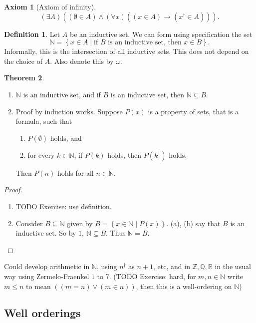 \documentclass{article}
\newcommand{\N}{\mathbb{N}}
\newcommand{\Z}{\mathbb{Z}}
\newcommand{\Q}{\mathbb{Q}}
\newcommand{\R}{\mathbb{R}}
\newcommand{\rb}[1]{\left( #1 \right)}
\newcommand{\cb}[1]{\left\{ #1 \right\}}
\newcommand{\orb}[2]{\rb{#1 \lor #2}}
\newcommand{\andb}[2]{\rb{#1 \land #2}}
\newcommand{\impb}[2]{\rb{#1 \rightarrow #2}}
\newcommand{\fab}[1]{\rb{\forall #1}}
\newcommand{\teb}[1]{\rb{\exists #1}}
\newcommand{\eqb}[2]{\rb{#1 = #2}}
\newcommand{\inb}[2]{\rb{#1 \in #2}}
\theoremstyle{definition}\newtheorem{definition}{Definition}[subsection]
\theoremstyle{definition}\newtheorem{remark}[definition]{Remark}
\theoremstyle{definition}\newtheorem*{example}{Example}
\theoremstyle{definition}\newtheorem*{note}{Note}
\newtheorem{theorem}[definition]{Theorem}
\newtheorem{axiom}{Axiom}
\begin{document}
\begin{axiom}[Axiom of infinity]
$$ \teb{A}\andb{\inb{\emptyset}{A}}{\fab{x}\impb{\inb{x}{A}}{\inb{x^\dagger}{A}}}. $$
\end{axiom}

\begin{definition}
Let $ A $ be an inductive set. We can form using specification the set
$$ \N = \cb{x \in A \mid \text{if } B \text{ is an inductive set, then } x \in B}. $$
Informally, this is the intersection of all inductive sets. This does not depend on the choice of $ A $. Also denote this by $ \omega $.
\end{definition}

\begin{theorem}
\label{thm:3.2.3}
\hfill
\begin{enumerate}
\item $ \N $ is an inductive set, and if $ B $ is an inductive set, then $ \N \subseteq B $.
\item Proof by induction works. Suppose $ P\rb{x} $ is a property of sets, that is a formula, such that
\begin{enumerate}
\item $ P\rb{\emptyset} $ holds, and
\item for every $ k \in \N $, if $ P\rb{k} $ holds, then $ P\rb{k^\dagger} $ holds.
\end{enumerate}
Then $ P\rb{n} $ holds for all $ n \in \N $.
\end{enumerate}
\end{theorem}

\begin{proof}
\hfill
\begin{enumerate}
\item TODO Exercise: use definition.
\item Consider $ B \subseteq \N $ given by $ B = \cb{x \in \N \mid P\rb{x}} $. (a), (b) say that $ B $ is an inductive set. So by $ 1 $, $ \N \subseteq B $. Thus $ \N = B $.
\end{enumerate}
\end{proof}

Could develop arithmetic in $ \N $, using $ n^\dagger $ as $ n + 1 $, etc, and in $ \Z, \Q, \R $ in the usual way using Zermelo-Fraenkel $ 1 $ to $ 7 $. (TODO Exercise: hard, for $ m, n \in \N $ write $ m \le n $ to mean $ \orb{\eqb{m}{n}}{\inb{m}{n}} $, then this is a well-ordering on $ \N $)

\subsection{Well orderings}
\end{document}
